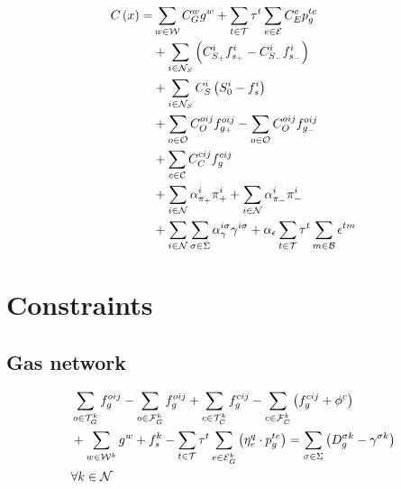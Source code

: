 \begin{equation}
\begin{aligned}
C \left( x \right) = & \sum_{w \in \cal{W}}{C^{w}_{G} g^{w}} + \sum_{t \in \cal{T}} {\tau}^{t}  \sum_{e \in \cal{E}} {C^{e}_{E} p_{g}^{te}}\\ 
				& + \sum_{i \in {\cal{N}}_{S}}{\left({C^{i}_{S_+} f^{i}_{s_+}} - {C^{i}_{S_-} f^{i}_{s_-}}  \right)}\\
				& + \sum_{i \in {\cal{N}}_{S}}{C^{i}_{S} \left( S^{i}_{0} - f^{i}_{s} \right)} \\
				& + \sum_{o \in \cal{O}}{C^{oij}_{O} f^{oij}_{g_+}} - \sum_{o \in \cal{O}}{C^{oij}_{O} f^{oij}_{g_-}} \\
				& + \sum_{c \in \cal{C}}{C^{cij}_{C} f^{cij}_{g}} \\ 
				& + \sum_{i \in \cal{N}}{\alpha^{i}_{\pi_+} \pi^{i}_{+}} + \sum_{i \in \cal{N}}{ \alpha^{i}_{\pi_-} \pi^{i}_{-}} \\
				& + \sum_{i \in \cal{N}}\sum_{\sigma \in \Sigma} {\alpha_{\gamma}^{i \sigma}\gamma^{i \sigma}} + \alpha_{\epsilon} \sum_{t \in \cal{T}} {\tau}^{t} \sum_{m \in \cal{B}} {\epsilon^{tm}}  
\end{aligned}
\label{obj_func}
\end{equation}

\section{Constraints}

\subsection{Gas network}


\begin{equation}
\begin{aligned}
& \sum_{o \in {\cal{T}}^{k}_{G}}{{f}_{g}^{oij}} - \sum_{o \in {\cal{F}}^{k}_{G}}{{f}_{g}^{oij}} + \sum_{c \in {\cal{T}}^{k}_{C}}{{f}_{g}^{cij}} - \sum_{c \in {\cal{F}}^{k}_{C}}{ \left({f}_{g}^{cij} + \phi^{c}\right)} \\
& + \sum_{w \in {\cal{W}}^{k}}{g^{w}}  + {f}^{k}_{s} - \sum_{t \in \cal{T}} {\tau}^{t} \sum_{e \in {\cal{E}}^{k}_{G}}\left({\eta^{q}_{e}}\cdot {p_{g}^{te}}\right) = {\sum_{\sigma \in \Sigma}\left( D^{\sigma k}_{g} - \gamma^{\sigma k}\right)} \\
& \forall k \in \cal{N}
\end{aligned}
\label{node_gas_balance}
\end{equation}

